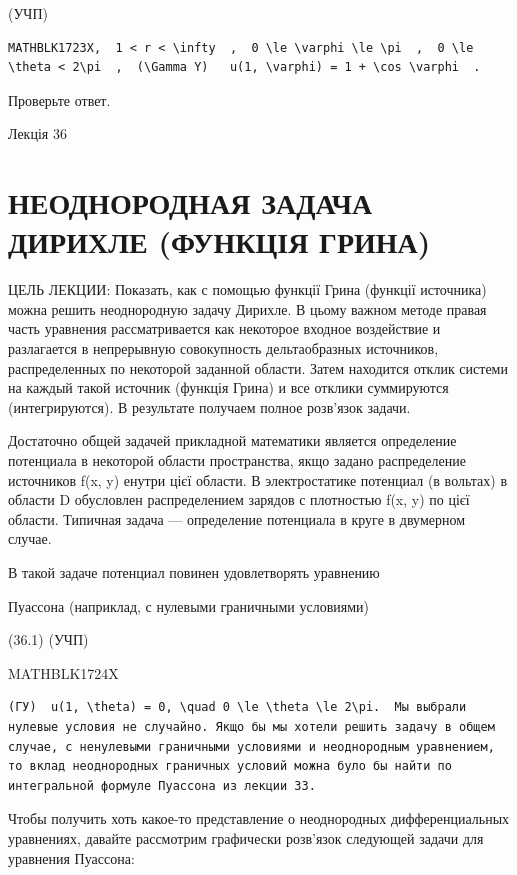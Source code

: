 \documentclass[
  ukrainian,
]{article}
\begin{document}
(УЧП)

\begin{verbatim}
MATHBLK1723X,  1 < r < \infty  ,  0 \le \varphi \le \pi  ,  0 \le \theta < 2\pi  ,  (\Gamma Y)   u(1, \varphi) = 1 + \cos \varphi  .
\end{verbatim}

Проверьте ответ.

Лекція 36

\section{НЕОДНОРОДНАЯ ЗАДАЧА ДИРИХЛЕ (ФУНКЦІЯ
ГРИНА)}\label{ux43dux435ux43eux434ux43dux43eux440ux43eux434ux43dux430ux44f-ux437ux430ux434ux430ux447ux430-ux434ux438ux440ux438ux445ux43bux435-ux444ux443ux43dux43aux446ux456ux44f-ux433ux440ux438ux43dux430}

ЦЕЛЬ ЛЕКЦИИ: Показать, как с помощью функції Грина (функції источника)
можна решить неоднородную задачу Дирихле. В цьому важном методе правая
часть уравнения рассматривается как некоторое входное воздействие и
разлагается в непрерывную совокупность дельтаобразных источников,
распределенных по некоторой заданной области. Затем находится отклик
системи на каждый такой источник (функція Грина) и все отклики
суммируются (интегрируются). В результате получаем полное розв'язок
задачи.

Достаточно общей задачей прикладной математики является определение
потенциала в некоторой области пространства, якщо задано распределение
источников f(x, y) енутри цієї области. В электростатике потенциал (в
вольтах) в области D обусловлен распределением зарядов с плотностью f(x,
y) по цієї области. Типичная задача --- определение потенциала в круге в
двумерном случае.

В такой задаче потенциал повинен удовлетворять уравнению

Пуассона (наприклад, с нулевыми граничными условиями)

(36.1) (УЧП)

MATHBLK1724X

\begin{verbatim}
(ГУ)  u(1, \theta) = 0, \quad 0 \le \theta \le 2\pi.  Мы выбрали нулевые условия не случайно. Якщо бы мы хотели решить задачу в общем случае, с ненулевыми граничными условиями и неоднородным уравнением, то вклад неоднородных граничных условий можна було бы найти по интегральной формуле Пуассона из лекции 33.
\end{verbatim}

Чтобы получить хоть какое-то представление о неоднородных
дифференциальных уравнениях, давайте рассмотрим графически розв'язок
следующей задачи для уравнения Пуассона:
\end{document}
